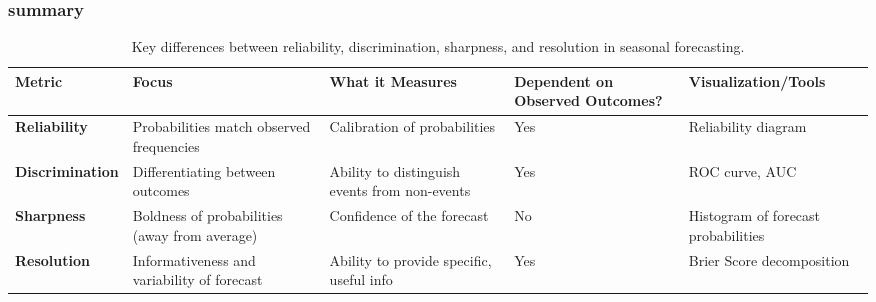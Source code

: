 \subsubsection{summary}
\begin{table}[h!]
\centering
\begin{tabularx}{\textwidth}{@{}p{2.5cm}p{4cm}p{4cm}p{2.5cm}p{3cm}@{}}
\toprule
\textbf{Metric}       & \textbf{Focus}                                    & \textbf{What it Measures}                         & \textbf{Dependent on Observed Outcomes?} & \textbf{Visualization/Tools}             \\ \midrule
\textbf{Reliability}   & Probabilities match observed frequencies          & Calibration of probabilities                      & Yes                                      & Reliability diagram                      \\
\textbf{Discrimination} & Differentiating between outcomes                 & Ability to distinguish events from non-events    & Yes                                      & ROC curve, AUC                           \\
\textbf{Sharpness}     & Boldness of probabilities (away from average)     & Confidence of the forecast                        & No                                       & Histogram of forecast probabilities      \\
\textbf{Resolution}    & Informativeness and variability of forecast       & Ability to provide specific, useful info         & Yes                                      & Brier Score decomposition                \\ \bottomrule
\end{tabularx}
\caption{Key differences between reliability, discrimination, sharpness, and resolution in seasonal forecasting.}
\label{tab:forecast_metrics}
\end{table}

\newpage
\thispagestyle{empty}
\mbox{}